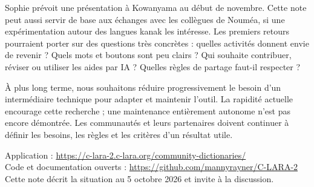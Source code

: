 \documentclass[11pt,a4paper]{article}
\newcommand{\rubrique}[1]{\vspace{5pt}{\large\bfseries\textcolor{accent}{#1}\par}\vspace{2pt}}
\begin{document}
\rubrique{Prochaine étape : essayer et choisir ensemble}
Sophie prévoit une présentation à Kowanyama au début de novembre. Cette note peut
aussi servir de base aux échanges avec les collègues de Nouméa, si une
expérimentation autour des langues kanak les intéresse. Les premiers retours
pourraient porter sur des questions très concrètes : quelles activités donnent
envie de revenir ? Quels mots et boutons sont peu clairs ? Qui souhaite contribuer,
réviser ou utiliser les aides par IA ? Quelles règles de partage faut-il respecter ?

À plus long terme, nous souhaitons réduire progressivement le besoin d'un
intermédiaire technique pour adapter et maintenir l'outil. La rapidité actuelle
encourage cette recherche ; une maintenance entièrement autonome n'est pas encore
démontrée. Les communautés et leurs partenaires doivent continuer à définir les
besoins, les règles et les critères d'un résultat utile.

\vfill
{\small Application : \url{https://c-lara-2.c-lara.org/community-dictionaries/}\\
Code et documentation ouverts : \url{https://github.com/mannyrayner/C-LARA-2}\\
Cette note décrit la situation au 5 octobre 2026 et invite à la discussion.}
\end{document}
